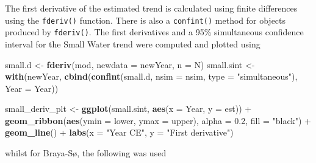 \documentclass[12pt,]{article}
\newenvironment{Shaded}{\begin{snugshade}}{\end{snugshade}}
\newcommand{\KeywordTok}[1]{\textcolor[rgb]{0.13,0.29,0.53}{\textbf{{#1}}}}
\newcommand{\DataTypeTok}[1]{\textcolor[rgb]{0.13,0.29,0.53}{{#1}}}
\newcommand{\FloatTok}[1]{\textcolor[rgb]{0.00,0.00,0.81}{{#1}}}
\newcommand{\StringTok}[1]{\textcolor[rgb]{0.31,0.60,0.02}{{#1}}}
\newcommand{\NormalTok}[1]{{#1}}
\begin{document}
The first derivative of the estimated trend is calculated using finite
differences using the \texttt{fderiv()} function. There is also a
\texttt{confint()} method for objects produced by \texttt{fderiv()}. The
first derivatives and a 95\% simultaneous confidence interval for the
Small Water trend were computed and plotted using

\begin{Shaded}
\begin{Highlighting}[]
\NormalTok{small.d <-}\StringTok{ }\KeywordTok{fderiv}\NormalTok{(mod, }\DataTypeTok{newdata =} \NormalTok{newYear, }\DataTypeTok{n =} \NormalTok{N)}
\NormalTok{small.sint <-}\StringTok{ }\KeywordTok{with}\NormalTok{(newYear,}
                   \KeywordTok{cbind}\NormalTok{(}\KeywordTok{confint}\NormalTok{(small.d, }\DataTypeTok{nsim =} \NormalTok{nsim,}
                                 \DataTypeTok{type =} \StringTok{"simultaneous"}\NormalTok{),}
                         \DataTypeTok{Year =} \NormalTok{Year))}

\NormalTok{small_deriv_plt <-}\StringTok{ }\KeywordTok{ggplot}\NormalTok{(small.sint, }\KeywordTok{aes}\NormalTok{(}\DataTypeTok{x =} \NormalTok{Year, }\DataTypeTok{y =} \NormalTok{est)) +}
\StringTok{    }\KeywordTok{geom_ribbon}\NormalTok{(}\KeywordTok{aes}\NormalTok{(}\DataTypeTok{ymin =} \NormalTok{lower, }\DataTypeTok{ymax =} \NormalTok{upper), }\DataTypeTok{alpha =} \FloatTok{0.2}\NormalTok{,}
                \DataTypeTok{fill =} \StringTok{"black"}\NormalTok{) +}
\StringTok{    }\KeywordTok{geom_line}\NormalTok{() +}
\StringTok{    }\KeywordTok{labs}\NormalTok{(}\DataTypeTok{x =} \StringTok{"Year CE"}\NormalTok{, }\DataTypeTok{y =} \StringTok{"First derivative"}\NormalTok{)}
\end{Highlighting}
\end{Shaded}

whilst for Braya-Sø, the following was used
\end{document}
